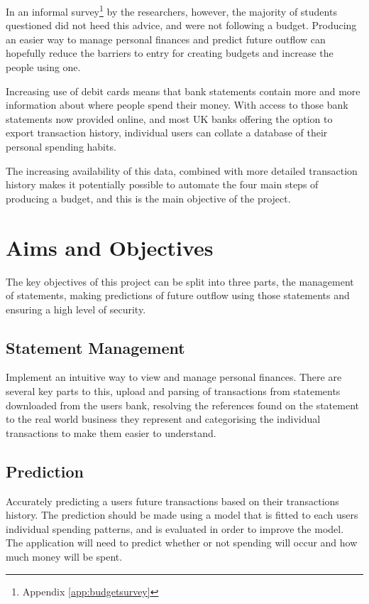 In an informal survey\footnote{Appendix \ref{app:budgetsurvey}} by the researchers, however, the majority of students questioned did not heed this advice, and were not following a budget. Producing an easier way to manage personal finances and predict future outflow can hopefully reduce the barriers to entry for creating budgets and increase the people using one.

Increasing use of debit cards \parencite{bbc2010debit} means that bank statements contain more and more information about where people spend their money. With access to those bank statements now provided online, and most UK banks offering the option to export \gls{transaction} history, individual users can collate a database of their personal spending habits.

The increasing availability of this data, combined with more detailed \gls{transaction} history makes it potentially possible to automate the four main steps of producing a budget, and this is the main objective of the project.

\section{Aims and Objectives}
The key objectives of this project can be split into three parts, the management of statements, making predictions of future outflow using those statements and ensuring a high level of security.

\subsection{Statement Management}
Implement an intuitive way to view and manage personal finances.
%
There are several key parts to this, upload and parsing of \glspl{transaction} from statements downloaded from the users bank, resolving the \glspl{reference} found on the statement to the real world business they represent and categorising the individual \glspl{transaction} to make them easier to understand.
    
\subsection{Prediction}
Accurately predicting a users future \glspl{transaction} based on their \glspl{transaction} history.
%
The prediction should be made using a model that is fitted to each users individual spending patterns, and is evaluated in order to improve the model.
%
The application will need to predict whether or not spending will occur and how much money will be spent.

